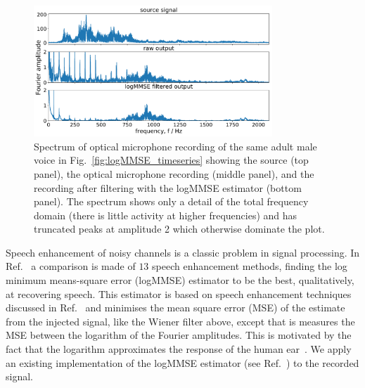 \documentclass[paper-main.tex]{subfiles}
\begin{document}
\begin{figure}
	\includegraphics[width=0.8\textwidth]{figures/combined_spectrum_melatos.pdf}
	\caption{Spectrum of optical microphone recording of the same adult male voice in Fig.~\ref{fig:logMMSE_timeseries} showing the source (top panel), the optical microphone recording (middle panel), and the recording after filtering with the logMMSE estimator (bottom panel). The spectrum shows only a detail of the total frequency domain (there is little activity at higher frequencies) and has truncated peaks at amplitude 2 which otherwise dominate the plot.}
	\label{fig:logMMSE_spectrum}
\end{figure}


Speech enhancement of noisy channels is a classic problem in signal processing. 
In Ref.~\cite{SubjectiveComparison} a comparison is made of $13$ speech enhancement methods, finding the log minimum means-square error (logMMSE) estimator to be the best, qualitatively, at recovering speech. 
This estimator is based on speech enhancement techniques discussed in Ref.~\cite{Ephraim1984SpeechEU_logMMSE} and minimises the mean square error (MSE) of the estimate from the injected signal, like the Wiener filter above, except that is measures the MSE between the logarithm of the Fourier amplitudes. This is motivated by the fact that the logarithm approximates the response of the human ear~\cite{SubjectiveComparison}. We apply an existing implementation of the logMMSE estimator (see Ref.~\cite{logmmse}) to the recorded signal.
\end{document}
